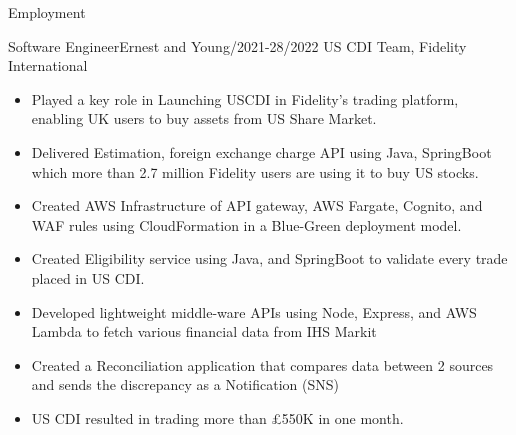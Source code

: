 \documentclass[]{mcdowellcv}
\begin{document}
\begin{cvsection}{Employment}
        \begin{cvsubsection}{Software Engineer}{Ernest and Young}{/2021-28/2022}
            US CDI Team,    Fidelity International
            \begin{itemize}
                \item Played a key role in Launching USCDI in Fidelity's trading platform, enabling UK users to buy assets from US Share Market.
                \item Delivered Estimation, foreign exchange charge API using Java, SpringBoot which more than 2.7 million
                Fidelity users are using it to buy US stocks.
                \item Created AWS Infrastructure of API gateway, AWS Fargate, Cognito, and WAF rules using CloudFormation in a Blue-Green deployment model.
                \item Created Eligibility service using Java, and SpringBoot to validate every trade placed in US CDI.
                \item Developed lightweight middle-ware APIs using Node, Express, and AWS Lambda to fetch various financial data from IHS Markit
                \item Created a Reconciliation application that compares data between 2 sources and sends the discrepancy as a
                Notification (SNS)
                \item US CDI resulted in trading more than £550K in one month.
            \end{itemize}
        \end{cvsubsection}
%

\end{cvsection}
\end{document}
